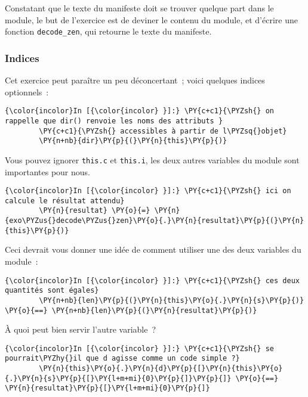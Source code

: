     Constatant que le texte du manifeste doit se trouver quelque part dans
le module, le but de l'exercice est de deviner le contenu du module, et
d'écrire une fonction \texttt{decode\_zen}, qui retourne le texte du
manifeste.

    \hypertarget{indices}{%
\subsubsection{Indices}\label{indices}}

    Cet exercice peut paraître un peu déconcertant~; voici quelques indices
optionnels~:

    \begin{Verbatim}[commandchars=\\\{\}]
{\color{incolor}In [{\color{incolor} }]:} \PY{c+c1}{\PYZsh{} on rappelle que dir() renvoie les noms des attributs }
        \PY{c+c1}{\PYZsh{} accessibles à partir de l\PYZsq{}objet}
        \PY{n+nb}{dir}\PY{p}{(}\PY{n}{this}\PY{p}{)}
\end{Verbatim}


    Vous pouvez ignorer \texttt{this.c} et \texttt{this.i}, les deux autres
variables du module sont importantes pour nous.

    \begin{Verbatim}[commandchars=\\\{\}]
{\color{incolor}In [{\color{incolor} }]:} \PY{c+c1}{\PYZsh{} ici on calcule le résultat attendu}
        \PY{n}{resultat} \PY{o}{=} \PY{n}{exo\PYZus{}decode\PYZus{}zen}\PY{o}{.}\PY{n}{resultat}\PY{p}{(}\PY{n}{this}\PY{p}{)}
\end{Verbatim}


    Ceci devrait vous donner une idée de comment utiliser une des deux
variables du module~:

    \begin{Verbatim}[commandchars=\\\{\}]
{\color{incolor}In [{\color{incolor} }]:} \PY{c+c1}{\PYZsh{} ces deux quantités sont égales}
        \PY{n+nb}{len}\PY{p}{(}\PY{n}{this}\PY{o}{.}\PY{n}{s}\PY{p}{)} \PY{o}{==} \PY{n+nb}{len}\PY{p}{(}\PY{n}{resultat}\PY{p}{)}
\end{Verbatim}


    À quoi peut bien servir l'autre variable~?

    \begin{Verbatim}[commandchars=\\\{\}]
{\color{incolor}In [{\color{incolor} }]:} \PY{c+c1}{\PYZsh{} se pourrait\PYZhy{}il que d agisse comme un code simple ?}
        \PY{n}{this}\PY{o}{.}\PY{n}{d}\PY{p}{[}\PY{n}{this}\PY{o}{.}\PY{n}{s}\PY{p}{[}\PY{l+m+mi}{0}\PY{p}{]}\PY{p}{]} \PY{o}{==} \PY{n}{resultat}\PY{p}{[}\PY{l+m+mi}{0}\PY{p}{]}
\end{Verbatim}



